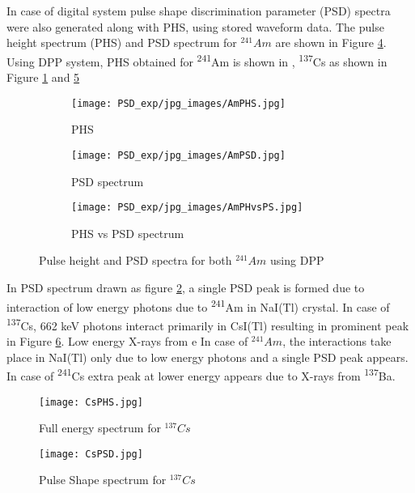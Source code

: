 \documentclass[10pt]{article}
\begin{document}
In case of digital system pulse shape discrimination parameter (PSD) spectra were also generated along with PHS, using stored waveform data. 
The pulse height spectrum (PHS) and PSD spectrum for $^{241}Am$ are shown in Figure \ref{Am_digi}. 
Using DPP system, PHS obtained for \textsuperscript{241}Am is shown in , \textsuperscript{137}Cs as shown in Figure \ref{PHSAm} and \ref{PHSCs}
\begin{figure}[ht]
	\begin{subfigure}{0.3\textwidth} 
		 \centering       
        \texttt{[image: PSD\_exp/jpg\_images/AmPHS.jpg]}         
        \caption{PHS}
        \label{PHSAm}
	\end{subfigure}

	\begin{subfigure}{0.3\textwidth} 
		 \centering       
        \texttt{[image: PSD\_exp/jpg\_images/AmPSD.jpg]}         
        \caption{PSD spectrum }
        \label{PSDAm}        
	\end{subfigure}
	
	\begin{subfigure}[ht]{0.3\textwidth}		
		\texttt{[image: PSD\_exp/jpg\_images/AmPHvsPS.jpg]}         
		\caption{PHS vs PSD spectrum}
		\label{PHvsPSAm}
	\end{subfigure}
\caption{Pulse height and PSD spectra for both $^{241}Am$ using DPP}
\label{Am_digi}
\end{figure}

In PSD spectrum drawn as figure \ref{PSDAm}, a single PSD peak is formed due to interaction of low energy photons due to \textsuperscript{241}Am in NaI(Tl) crystal. In case of \textsuperscript{137}Cs, 662 keV photons interact primarily in CsI(Tl) resulting in prominent peak in Figure \ref{PSDCs}. Low energy X-rays from  e
In case of $^{241}Am$, the interactions take place in NaI(Tl) only due to low energy photons and a single PSD peak appears. In case of \textsuperscript{241}Cs extra peak at lower energy appears due to X-rays from \textsuperscript{137}Ba.  

\begin{figure}[ht]
        \centering
        \texttt{[image: CsPHS.jpg]}         
        \caption{Full energy spectrum for $^{137}Cs$}
        \label{PHSCs}
\end{figure}
\begin{figure}[ht]
        \centering
        \texttt{[image: CsPSD.jpg]}         
        \caption{Pulse Shape spectrum for $^{137}Cs$}
        \label{PSDCs}
\end{figure}
\end{document}
